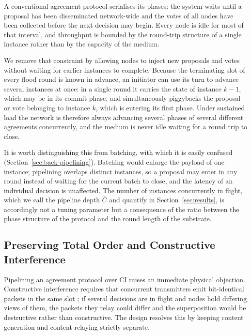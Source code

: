 \documentclass[journal]{IEEEtran}
\newcommand{\CI}{CI}                      %
\newcommand{\Cdepth}{\bar{C}}             %
\begin{document}

A conventional agreement protocol serialises its phases: the system waits
until a proposal has been disseminated network-wide and the votes of all
nodes have been collected before the next decision may begin. Every node
is idle for most of that interval, and throughput is bounded by the
round-trip structure of a single instance rather than by the capacity of
the medium.

We remove that constraint by allowing nodes to inject new proposals and
votes without waiting for earlier instances to complete. Because the
terminating slot of every flood round is known in advance, an initiator
can use its turn to advance several instances at once: in a single round
it carries the state of instance $k-1$, which may be in its commit phase,
and simultaneously piggybacks the proposal or vote belonging to instance
$k$, which is entering its first phase. Under sustained load the network
is therefore always advancing several phases of several different
agreements concurrently, and the medium is never idle waiting for a
round trip to close.

It is worth distinguishing this from batching, with which it is easily
confused (Section~\ref{sec:back-pipelining}). Batching would enlarge the
payload of one instance; pipelining overlaps distinct instances, so a
proposal may enter in any round instead of waiting for the current batch
to close, and the latency of an individual decision is unaffected. The
number of instances concurrently in flight, which we call the pipeline
depth $\Cdepth$ and quantify in Section~\ref{sec:results}, is accordingly
not a tuning parameter but a consequence of the ratio between the phase
structure of the protocol and the round length of the substrate.

\subsection{Preserving Total Order and Constructive Interference}
\label{sec:design-order}

Pipelining an agreement protocol over \CI{} raises an immediate physical
objection. Constructive interference requires that concurrent
transmitters emit bit-identical packets in the same slot
\cite{ferrari11glossy}; if several decisions are in flight and nodes hold
differing views of them, the packets they relay could differ and the
superposition would be destructive rather than constructive. The design
resolves this by keeping content generation and content relaying strictly
separate.
\end{document}
